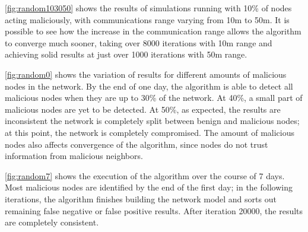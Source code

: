 \documentclass[conference]{IEEEtran}
\begin{document}
\autoref{fig:random103050} shows the results of simulations running with 10\% of nodes acting maliciously, with communications range varying from 10m to 50m.
It is possible to see how the increase in the communication range allows the algorithm to converge much sooner, taking over 8000 iterations with 10m range and achieving solid results at just over 1000 iterations with 50m range. 

\autoref{fig:random0} shows the variation of results for different amounts of malicious nodes in the network.
By the end of one day, the algorithm is able to detect all malicious nodes when they are up to 30\% of the network.
At 40\%, a small part of malicious nodes are yet to be detected.
At 50\%, as expected, the results are inconsistent the network is completely split between benign and malicious nodes; at this point, the network is completely compromised.
The amount of malicious nodes also affects convergence of the algorithm, since nodes do not trust information from malicious neighbors.

\autoref{fig:random7} shows the execution of the algorithm over the course of 7 days.
Most malicious nodes are identified by the end of the first day; in the following iterations, the algorithm finishes building the network model and sorts out remaining false negative or false positive results.
After iteration 20000, the results are completely consistent.



%
%
%

\end{document}
